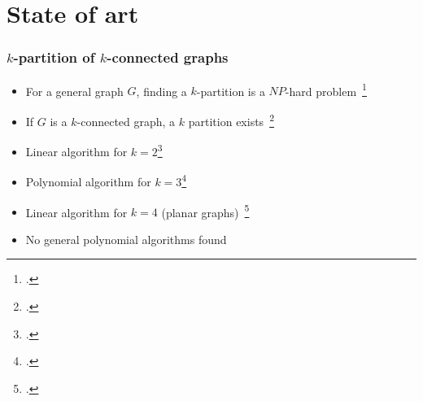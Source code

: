 \section{State of art}
%


\begin{frame}
  \frametitle{$k$-partition of $k$-connected graphs}
  \begin{itemize}
  \item For a general graph $G$, finding a $k$-partition is a $NP$-hard
    problem~\footcite{BF06}%
  \item If $G$ is a $k$-connected graph, a $k$ partition exists~\footcite{GE78,LL77}
  \item Linear algorithm for $k = 2$\footcite{Suzuki1990227}
  \item Polynomial algorithm for $k = 3$\footcite{Wada1994}
  \item Linear algorithm for $k = 4$ (planar graphs)~\footcite{Nakano1997315}
  \item No general polynomial algorithms found
  \end{itemize}
\end{frame}

